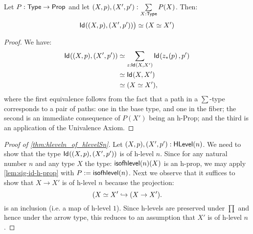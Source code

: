 \begin{lem}\label{lem:sig-id-h-prop}
 Let $P : \mathsf{Type} \to \mathsf{Prop}$ and let $(X, p), (X', p') : \sum\limits_{X : \mathsf{Type}} P(X)$. Then:
 \[ \mathsf{Id}_{}((X, p),(X', p')) \big) \simeq (X \simeq X')\]
\end{lem}

\begin{proof}
 We have:
 \begin{equation*}\begin{split}
 \mathsf{Id}_{}((X, p),(X', p')) & \simeq \sum_{z : \mathsf{Id}_{}(X,X')} \mathsf{Id}_{}({z}_{*}\!\left({p}\right),p') \\
  & \simeq \mathsf{Id}_{}(X,X') \\
  & \simeq (X \simeq X'),
 \end{split}
 \end{equation*}
 where the first equivalence follows from the fact that a path in a $\sum$-type corresponds to a pair of paths: one in the base type, and one in the fiber; the second is an immediate consequence of $P(X')$ being an h-Prop; and the third is an application of the Univalence Axiom.
\end{proof}

\begin{proof}[Proof of \autoref{thm:hleveln_of_hlevelSn}]
 Let $(X, p), (X', p') : \mathsf{HLevel}(n)$. We need to show that the type $\mathsf{Id}_{}((X, p),(X', p'))$ is of h-level $n$. Since for any natural number $n$ and any type $X$ the type: $\mathsf{isofhlevel}(n)(X)$ is an h-prop, we may apply \autoref{lem:sig-id-h-prop} with $P := \mathsf{isofhlevel}(n)$. Next we observe that it suffices to show that $X \rightarrow X'$ is of h-level $n$ because the projection:
 \[(X \simeq X' \hookrightarrow (X \rightarrow X').\]
 is an inclusion (i.e. a map of h-level $1$). Since h-levels are preserved under $\prod$ and hence under the arrow type, this reduces to an assumption that $X'$ is of h-level $n$.
\end{proof}